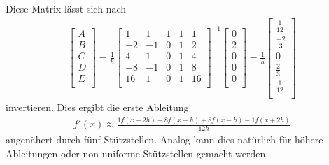 Diese Matrix lässt sich nach
\begin{align}
\begin{bmatrix}
A \\
B \\
C \\
D \\
E \\
\end{bmatrix}
=
\frac{1}{h}
\begin{bmatrix}
1 & 1 & 1 & 1 & 1 \\
-2 & -1 & 0 & 1 & 2 \\
4 & 1 & 0 & 1 & 4 \\
-8 & -1 & 0 & 1 & 8 \\
16 & 1 & 0 & 1 & 16 \\
\end{bmatrix}^{-1}
\begin{bmatrix}
0 \\
2 \\
0 \\
0 \\
0 \\
\end{bmatrix}
=
\frac{1}{h}
\begin{bmatrix}
\frac{1}{12} \\
\frac{-2}{3} \\
0 \\
\frac{2}{3} \\
\frac{1}{12} \\
\end{bmatrix}
\end{align}
invertieren.
Dies ergibt die erste Ableitung
\begin{align}
f'(x)  \approx \frac{1f(x-2h) - 8f(x-h) + 8f(x-h) - 1f(x+2h)}{12h}
\label{ableitung:eqn:aprox_5}
\end{align}
angenähert durch fünf Stützstellen.
Analog kann dies natürlich für höhere Ableitungen oder non-uniforme Stützstellen gemacht werden.
